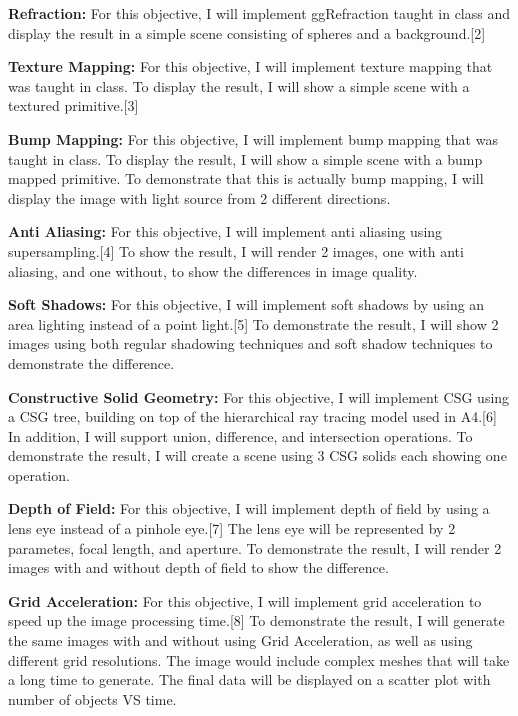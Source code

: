\documentclass {article}
\begin{document}
\begin{description}
    {\bf Refraction: }
    For this objective, I will implement ggRefraction taught in class and display the result in a simple scene consisting of spheres and a background.[2]

    {\bf Texture Mapping: }
    For this objective, I will implement texture mapping that was taught in class. To display the result, I will show a simple scene with a textured primitive.[3]

    {\bf Bump Mapping: }
    For this objective, I will implement bump mapping that was taught in class. To display the result, I will show a simple scene with a bump mapped primitive. To demonstrate that this is actually bump mapping, I will display the image with light source from 2 different directions.

    {\bf Anti Aliasing: }
    For this objective, I will implement anti aliasing using supersampling.[4] To show the result, I will render 2 images, one with anti aliasing, and one without, to show the differences in image quality.

    {\bf Soft Shadows: }
    For this objective, I will implement soft shadows by using an area lighting instead of a point light.[5] To demonstrate the result, I will show 2 images using both regular shadowing techniques and soft shadow techniques to demonstrate the difference.

    {\bf Constructive Solid Geometry: }
    For this objective, I will implement CSG using a CSG tree,  building on top of the hierarchical ray tracing model used in A4.[6] In addition, I will support union, difference, and intersection operations. To demonstrate the result, I will create a scene using 3 CSG solids each showing one operation.

    {\bf Depth of Field: }
    For this objective, I will implement depth of field by using a lens eye instead of a pinhole eye.[7] The lens eye will be represented by 2 parametes, focal length, and aperture. To demonstrate the result, I will render 2 images with and without depth of field to show the difference.

    {\bf Grid Acceleration: }
    For this objective, I will implement grid acceleration to speed up the image processing time.[8] To demonstrate the result, I will generate the same images with and without using Grid Acceleration, as well as using different grid resolutions. The image would include complex meshes that will take a long time to generate. The final data will be displayed on a scatter plot with number of objects VS time. 


\end{description}
\end{document}
